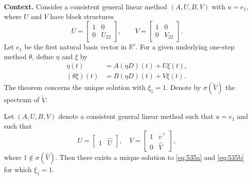\noindent\textbf{Context.}
Consider a consistent general linear method $(A,U,B,V)$ with $u=e_1$, where $U$ and $V$ have block structures
\[
U=\begin{bmatrix}1&0\\0&U_{22}\end{bmatrix},\qquad V=\begin{bmatrix}1&0\\0&V_{22}\end{bmatrix}.
\]
Let $e_1$ be the first natural basis vector in $\mathbb{R}^r$. For a given underlying one‑step method $\theta$, define $\eta$ and $\xi$ by
\begin{align}
\eta(t) &= A(\eta D)(t) + U\xi(t), \tag{535a}\\
(\theta\xi)(t) &= B(\eta D)(t) + V\xi(t). \tag{535b}
\end{align}
The theorem concerns the unique solution with $\xi_1=1$. Denote by $\sigma(\widetilde{V})$ the spectrum of $\widetilde{V}$.

\begin{theorem}

  \label{thm:535A}
Let $(A, U, B, V)$ denote a consistent general linear method such that $u = e_1$ and such that
\[
U = \begin{bmatrix} 1 & \widehat{U} \end{bmatrix}, \quad V = \begin{bmatrix} 1 & v^\top \\ 0 & \widehat{V} \end{bmatrix},
\]
where $1 \notin \sigma(\widehat{V})$. Then there exists a unique solution to \eqref{eq:535a} and \eqref{eq:535b} for which $\xi_1 = 1$.
\end{theorem}

